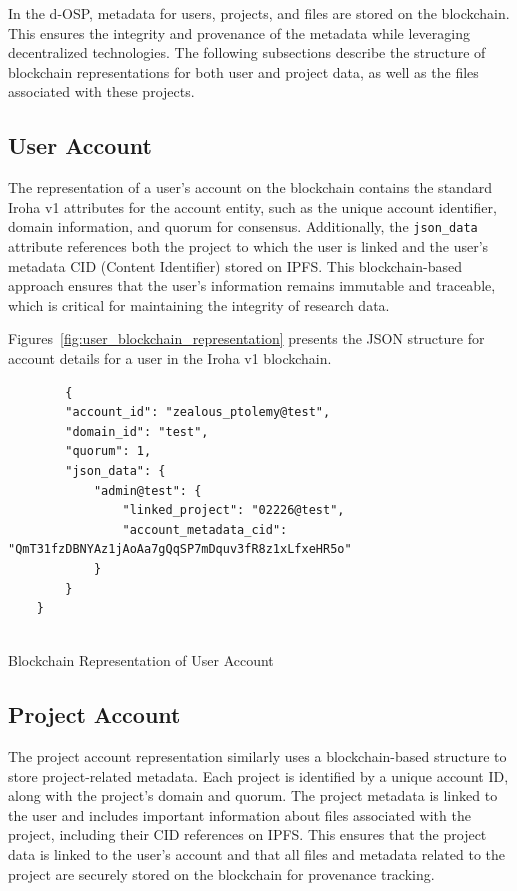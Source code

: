 \documentclass[final]{rc-book-2.14}
\begin{document}
In the d-OSP, metadata for users, projects, and files are stored on the blockchain. This ensures the integrity and provenance of the metadata while leveraging decentralized technologies. The following subsections describe the structure of blockchain representations for both user and project data, as well as the files associated with these projects.

\subsection{User Account}

The representation of a user's account on the blockchain contains the standard Iroha v1 attributes for the account entity, such as the unique account identifier, domain information, and quorum for consensus. Additionally, the \texttt{json\_data} attribute references both the project to which the user is linked and the user's metadata CID (Content Identifier) stored on IPFS. This blockchain-based approach ensures that the user’s information remains immutable and traceable, which is critical for maintaining the integrity of research data.

Figures~\ref{fig:user_blockchain_representation} presents the JSON structure for account details for a user in the Iroha v1 blockchain.


\begin{listing}
\begin{verbatim}
        {
        "account_id": "zealous_ptolemy@test",
        "domain_id": "test",
        "quorum": 1,
        "json_data": {
            "admin@test": {
                "linked_project": "02226@test",
                "account_metadata_cid": "QmT31fzDBNYAz1jAoAa7gQqSP7mDquv3fR8z1xLfxeHR5o"
            }
        }
    }
  
\end{verbatim}
\caption{Blockchain Representation of User Account}
\label{fig:user_blockchain_representation}
\end{listing}



\subsection{Project Account}

The project account representation similarly uses a blockchain-based structure to store project-related metadata. Each project is identified by a unique account ID, along with the project’s domain and quorum. The project metadata is linked to the user and includes important information about files associated with the project, including their CID references on IPFS. This ensures that the project data is linked to the user’s account and that all files and metadata related to the project are securely stored on the blockchain for provenance tracking.
\end{document}
